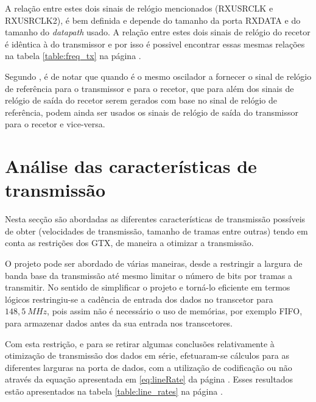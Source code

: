 A relação entre estes dois sinais de relógio mencionados (RXUSRCLK e RXUSRCLK2), é bem definida e depende do tamanho da porta RXDATA e do tamanho do \textit{datapath} usado.  A relação entre estes dois sinais de relógio do recetor é idêntica à do transmissor e por isso é possivel encontrar essas mesmas relações na tabela \ref{table:freq_tx} na página \pageref{table:freq_tx}.

Segundo \cite{R011}, é de notar que quando é o mesmo oscilador a fornecer o sinal de relógio de referência para o transmissor e para o recetor, que para além dos sinais de relógio de saída do recetor serem gerados com base no sinal de relógio de referência, podem ainda ser usados os sinais de relógio de saída do transmissor para o recetor e vice-versa.

\section{Análise das características de transmissão}

Nesta secção são abordadas as diferentes características de transmissão possíveis de obter (velocidades de transmissão, tamanho de tramas entre outras) tendo em conta as restrições dos GTX, de maneira a otimizar a transmissão.

O projeto pode ser abordado de várias maneiras, desde a restringir a largura de banda base da transmissão até mesmo limitar o número de bits por tramas  a transmitir. No sentido de simplificar o projeto e torná-lo eficiente em termos lógicos restringiu-se a cadência de entrada dos dados no transcetor para $148,5\ MHz$, pois assim não é necessário o uso de memórias, por exemplo FIFO, para armazenar dados antes da sua entrada nos transcetores.

Com esta restrição, e para se retirar algumas conclusões relativamente à otimização de transmissão dos dados em série, efetuaram-se cálculos para as diferentes larguras na porta de dados, com a utilização de codificação ou não através da equação apresentada em \ref{eq:lineRate} da página \pageref{eq:lineRate}. Esses resultados estão apresentados na tabela \ref{table:line_rates} na página \pageref{table:line_rates}.


